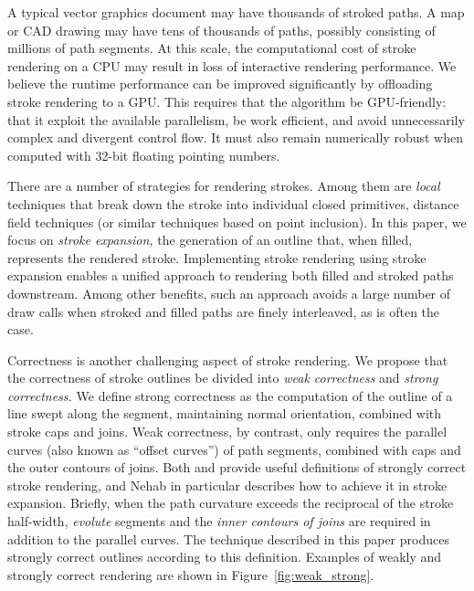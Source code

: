 \documentclass[sigconf, nonacm]{acmart}
\begin{document}
A typical vector graphics document may have thousands of stroked paths. A map or CAD drawing may have tens of thousands of paths, possibly consisting of millions of path segments. At this scale, the computational cost of stroke rendering on a CPU may result in loss of interactive rendering performance. We believe the runtime performance can be improved significantly by offloading stroke rendering to a GPU. This requires that the algorithm be GPU-friendly: that it exploit the available parallelism, be work efficient, and avoid unnecessarily complex and divergent control flow. It must also remain numerically robust when computed with 32-bit floating pointing numbers.

There are a number of strategies for rendering strokes. Among them are \emph{local} techniques that break down the stroke into individual closed primitives, distance field techniques (or similar techniques based on point inclusion). In this paper, we focus on \emph{stroke expansion,} the generation of an outline that, when filled, represents the rendered stroke. Implementing stroke rendering using stroke expansion enables a unified approach to rendering both filled and stroked paths downstream. Among other benefits, such an approach avoids a large number of draw calls when stroked and filled paths are finely interleaved, as is often the case.

Correctness is another challenging aspect of stroke rendering. We propose that the correctness of stroke outlines be divided into \emph{weak correctness} and \emph{strong correctness.} We define strong correctness as the computation of the outline of a line swept along the segment, maintaining normal orientation, combined with stroke caps and joins. Weak correctness, by contrast, only requires the parallel curves (also known as ``offset curves'') of path segments, combined with caps and the outer contours of joins. Both \citet{Nehab2020} and \citet{Kilgard2020} provide useful definitions of strongly correct stroke rendering, and Nehab in particular describes how to achieve it in stroke expansion. Briefly, when the path curvature exceeds the reciprocal of the stroke half-width, \emph{evolute} segments and the \emph{inner contours of joins} are required in addition to the parallel curves. The technique described in this paper produces strongly correct outlines according to this definition. Examples of weakly and strongly correct rendering are shown in Figure~\ref{fig:weak_strong}.
\end{document}

